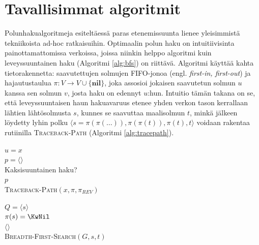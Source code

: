 \documentclass[finnish]{tktltiki2}
\newenvironment{finalgo}[1][htb]{
  \renewcommand{\algorithmcfname}{Algoritmi}
  \begin{algorithm}[#1]
}{\end{algorithm}}
\let\oldnl\nl%
\newcommand{\nonl}{\renewcommand{\nl}{\let\nl\oldnl}}
\theoremstyle{definition}
\theoremstyle{remark}
\begin{document}
\section{Tavallisimmat algoritmit}
\label{sec:basics}
Polunhakualgoritmeja esiteltäessä paras etenemissuunta lienee yleisimmistä tekniikoista ad-hoc ratkaisuihin. Optimaalin polun haku on intuitiivisinta painottamattomissa verkoissa, joissa niinkin helppo algoritmi kuin leveyssuuntainen haku (Algoritmi \ref{alg:bfs}) on riittävä. Algoritmi käyttää kahta tietorakennetta: saavutettujen solmujen FIFO-jonoa (engl. \textit{first-in, first-out}) ja hajautustaulua $\pi \colon V \to V \cup \{ \textbf{nil} \}$, joka assosioi jokaisen saavutetun solmun $u$ kanssa sen solmun $v$, josta haku on edennyt $u$:hun. Intuitio tämän takana on se, että leveyssuuntaisen haun hakuavaruus etenee yhden verkon tason kerrallaan lähtien lähtösolmusta $s$, kunnes se saavuttaa maalisolmun $t$, minkä jälkeen löydetty lyhin polku $\langle s = \pi(\pi(\dots)), \pi(\pi(t)), \pi(t), t \rangle$ voidaan rakentaa rutiinilla \textsc{Traceback-Path} (Algoritmi \ref{alg:tracepath}).
\begin{finalgo}
$u = x$ \\
$p = \langle  \rangle$ \\
\nonl Kaksisuuntainen haku? \\
\KwRet $p$ \\
\caption{\textsc{Traceback-Path}$(x, \pi, \pi_{REV})$}
\label{alg:tracepath}
\end{finalgo}

\begin{finalgo}
  $Q = \langle s \rangle$ \\
  $\pi(s) = \KwNil$ \\
  \KwRet $\langle \rangle$ \\
\caption{\textsc{Breadth-First-Search}$(G, s, t)$}
\label{alg:bfs}
\end{finalgo}
\end{document}
